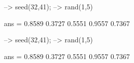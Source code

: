 \begin{DoxyVerbInclude}
--> seed(32,41);
--> rand(1,5)

ans = 
    0.8589    0.3727    0.5551    0.9557    0.7367 

--> seed(32,41);
--> rand(1,5)

ans = 
    0.8589    0.3727    0.5551    0.9557    0.7367 
\end{DoxyVerbInclude}
 
